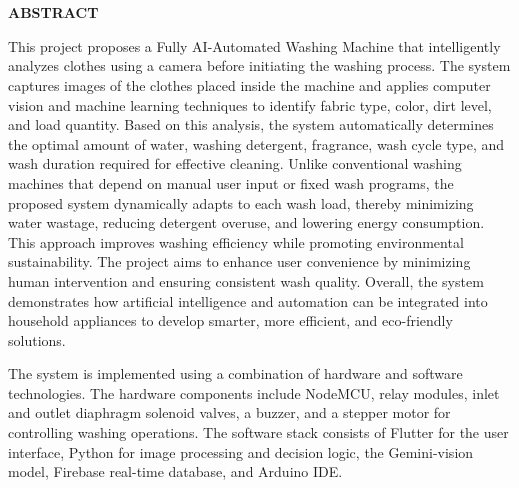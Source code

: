 \chapter*{}
\thispagestyle{footeronly}
\begin{center}
{\Large \textbf{ABSTRACT}}
\end{center}

\noindent
This project proposes a Fully AI-Automated Washing Machine that intelligently analyzes clothes using a camera before initiating the washing process. The system captures images of the clothes placed inside the machine and applies computer vision and machine learning techniques to identify fabric type, color, dirt level, and load quantity. Based on this analysis, the system automatically determines the optimal amount of water, washing detergent, fragrance, wash cycle type, and wash duration required for effective cleaning. Unlike conventional washing machines that depend on manual user input or fixed wash programs, the proposed system dynamically adapts to each wash load, thereby minimizing water wastage, reducing detergent overuse, and lowering energy consumption. This approach improves washing efficiency while promoting environmental sustainability. The project aims to enhance user convenience by minimizing human intervention and ensuring consistent wash quality. Overall, the system demonstrates how artificial intelligence and automation can be integrated into household appliances to develop smarter, more efficient, and eco-friendly solutions.

\noindent
The system is implemented using a combination of hardware and software technologies. The hardware components include NodeMCU, relay modules, inlet and outlet diaphragm solenoid valves, a buzzer, and a stepper motor for controlling washing operations. The software stack consists of Flutter for the user interface, Python for image processing and decision logic, the Gemini-vision model, Firebase real-time database, and Arduino IDE.

\vspace{0.5cm}
\noindent
